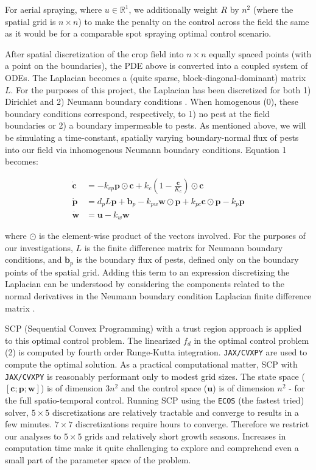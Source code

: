 \documentclass[11pt]{article}
\begin{document}
For aerial spraying, where $u \in \mathbb{R}^{1}$, we additionally weight $R$ by $n^2$ (where the spatial grid is $n \times n$) to make the penalty on the control across the field the same as it would be for a comparable spot spraying optimal control scenario.

After spatial discretization of the crop field into $n \times n$ equally spaced points (with a point on the boundaries), the PDE above is converted into a coupled system of ODEs. The Laplacian becomes a (quite sparse, block-diagonal-dominant) matrix $L$. For the purposes of this project, the Laplacian has been discretized for both 1) Dirichlet and 2) Neumann boundary conditions \cite{R5}. When homogenous (0), these boundary conditions correspond, respectively, to 1) no pest at the field boundaries or 2) a boundary impermeable to pests. As mentioned above, we will be simulating a time-constant, spatially varying boundary-normal flux of pests into our field via inhomogenous Neumann boundary conditions. Equation 1 becomes:

\begin{align}
\dot{\bm{c}} &= -k_{cp} \bm{p} \odot \bm{c} + k_c \left( 1 - \frac{\bm{c}}{K_c} \right) \odot \bm{c} \nonumber \\ 
\dot{\bm{p}} &= d_p L \bm{p} + \bm{b}_p - k_{pw} \bm{w} \odot \bm{p} + k_{pc} \bm{c} \odot \bm{p} - k_p \bm{p} \\
\dot{\bm{w}} &= \bm{u} - k_w \bm{w} \nonumber
\end{align}

where $\odot$ is the element-wise product of the vectors involved. For the purposes of our investigations, $L$ is the finite difference matrix for Neumann boundary conditions, and $\bm{b}_p$ is the boundary flux of pests, defined only on the boundary points of the spatial grid. Adding this term to an expression discretizing the Laplacian can be understood by considering the components related to the normal derivatives in the Neumann boundary condition Laplacian finite difference matrix \cite{R5}.

SCP (Sequential Convex Programming) with a trust region approach is applied to this optimal control problem. The linearized $f_d$ in the optimal control problem (2) is computed by fourth order Runge-Kutta integration. \texttt{JAX/CVXPY} are used to compute the optimal solution. As a practical computational matter, SCP with \texttt{JAX/CVXPY} is reasonably performant only to modest grid sizes. The state space ($[\bm{c};\bm{p};\bm{w}]$) is of dimension $3n^2$ and the control space ($\bm{u}$) is of dimension $n^2$ - for the full spatio-temporal control. Running SCP using the \texttt{ECOS} (the fastest tried) solver, $5 \times 5$ discretizations are relatively tractable and converge to results in a few minutes. $7 \times 7$ discretizations require hours to converge. Therefore we restrict our analyses to $5 \times 5$ grids and relatively short growth seasons. Increases in computation time make it quite challenging to explore and comprehend even a small part of the parameter space of the problem.
\end{document}
